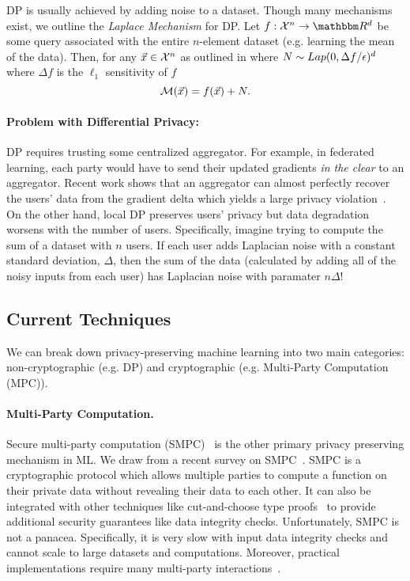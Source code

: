 DP is usually achieved by adding noise to a dataset.
Though many mechanisms exist, we outline the \emph{Laplace Mechanism} for DP.
Let $f: \mathcal{X}^n \rightarrow \R^d$ be some query associated with the entire $n$-element dataset (e.g. learning the mean of the data).
Then, for any $\vec{x} \in \mathcal{X}^n$ as outlined in \cite{Bassily_2015} where $N \sim Lap(0, \Delta f/ \epsilon)^{d}$ where $\Delta f$ is the $\ell_1$ sensitivity of $f$
\[
	\mathcal{M}(\vec{x}) = f(\vec{x}) + N.
\]

\paragraph{Problem with Differential Privacy:} DP requires trusting some centralized aggregator.
For example, in federated learning, each party would have to send their updated gradients \emph{in the clear} to an aggregator.
Recent work shows that an aggregator can almost perfectly recover the users' data from the gradient delta which yields a large privacy violation~\cite{gupta2022recoveringprivatetextfederated}.
On the other hand, local DP preserves users' privacy but data degradation worsens with the number of users.
Specifically, imagine trying to compute the sum of a dataset with $n$ users.
If each user adds Laplacian noise with a constant standard deviation, $\Delta$, then the sum of the data (calculated by adding all of the noisy inputs from each user) has Laplacian noise with paramater $n \Delta$!


\subsection{Current Techniques}
We can break down privacy-preserving machine learning into two main categories: non-cryptographic (e.g. DP) and cryptographic (e.g. Multi-Party Computation (MPC)).


\paragraph{Multi-Party Computation.}
Secure multi-party computation (SMPC)~\cite{yao1986generate} is the other primary privacy preserving mechanism in ML.
We draw from a recent survey on SMPC~\cite{zhou2024secure}.
SMPC is a cryptographic protocol which allows multiple parties to compute a function on their private data without revealing their data to each other.
It can also be integrated with other techniques like cut-and-choose type proofs~\cite{lindell2016fast} to provide additional security guarantees like data integrity checks.
Unfortunately, SMPC is not a panacea.
Specifically, it is very slow with input data integrity checks and cannot scale to large datasets and computations.
Moreover, practical implementations require many multi-party interactions~\cite{zhao2019secure}.

